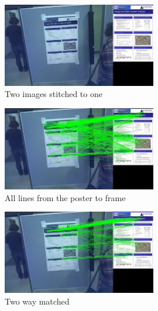 \documentclass{article}
\begin{document}
\newpage

\begin{figure}
\center
            \includegraphics[width=0.6\textwidth]{combined}
\caption{Two images stitched to one}
\end{figure}        
\begin{figure}
\center
            \includegraphics[width=0.6\textwidth]{alllines}
\caption{All lines from the poster to frame}
\end{figure}        
\begin{figure}
\center
            \includegraphics[width=0.6\textwidth]{linest}
\caption{Two way matched}
\end{figure}    
\end{document}
